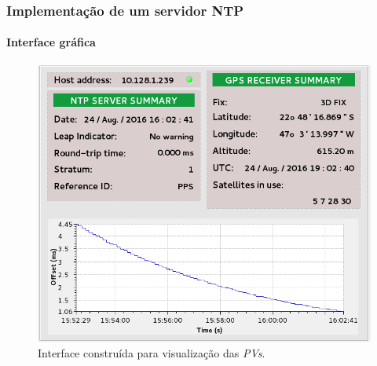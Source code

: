 \begin{frame}
\frametitle{Implementação de um servidor NTP}
\framesubtitle{Interface gráfica} 
\begin{figure}[h]
    \centering
    \includegraphics[scale=0.26]{image/epics-opi-ntpgps}
    \caption {Interface construída para visualização das
    \textit{PVs}.}
    \label{img:ntp-opi} 
\end{figure} 

\end{frame}